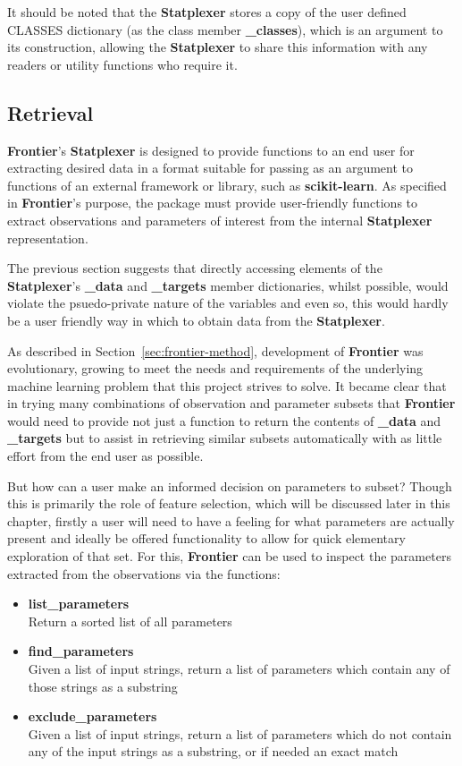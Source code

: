 It should be noted that the \textbf{Statplexer} stores a copy of the user
defined CLASSES dictionary (as the class member \textbf{\_classes}), which is an
argument to its construction, allowing the \textbf{Statplexer} to share this
information with any readers or utility functions who require it.


\subsection{Retrieval}

\textbf{Frontier}'s \textbf{Statplexer} is designed to provide functions to an
end user for extracting desired data in a format suitable for passing as an
argument to functions of an external framework or library, such as
\textbf{scikit-learn}. As specified in \textbf{Frontier}'s purpose, the package
must provide user-friendly functions to extract observations and parameters of
interest from the internal \textbf{Statplexer} representation.

The previous section suggests that directly accessing elements of the
\textbf{Statplexer}'s \textbf{\_data} and \textbf{\_targets} member dictionaries,
whilst possible, would violate the psuedo-private nature of the variables and even
so, this would hardly be a user friendly way in which to obtain data from the
\textbf{Statplexer}.

As described in Section~\ref{sec:frontier-method}, development of
\textbf{Frontier} was evolutionary, growing to meet the needs and requirements
of the underlying machine learning problem that this project strives to solve.
It became clear that in trying many combinations of observation and parameter
subsets that \textbf{Frontier} would need to provide not just a function to
return the contents of \textbf{\_data} and \textbf{\_targets} but to assist in
retrieving similar subsets automatically with as little effort from the end user
as possible.

But how can a user make an informed decision on parameters to subset?
Though this is primarily the role of feature selection, which will be discussed
later in this chapter, firstly a user will need to have a feeling for what
parameters are actually present and ideally be offered functionality to
allow for quick elementary exploration of that set. For this, \textbf{Frontier}
can be used to inspect the parameters extracted from the observations via the
functions:

\begin{itemize}
    \item \textbf{list\_parameters} \hfill\\
        Return a sorted list of all parameters
    \item \textbf{find\_parameters} \hfill\\
        Given a list of input strings, return a list of parameters which contain
        any of those strings as a substring
    \item \textbf{exclude\_parameters} \hfill\\
        Given a list of input strings, return a list of parameters which do not
        contain any of the input strings as a substring, or if needed an exact
        match
\end{itemize}

